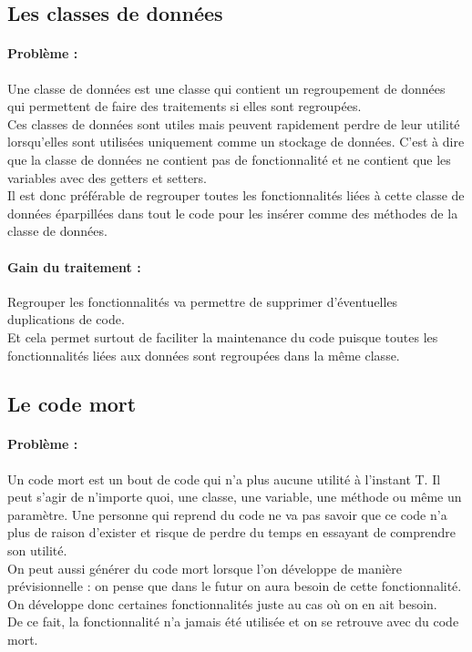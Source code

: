 \documentclass[a4paper,twoside,12pt,openright]{report}
\begin{document}
\subsection{Les classes de données}
\paragraph{Problème :}
Une classe de données est une classe qui contient un regroupement de données qui permettent de faire des traitements si elles sont regroupées.\\
Ces classes de données sont utiles mais peuvent rapidement perdre de leur utilité lorsqu'elles sont utilisées uniquement comme un stockage de données. C'est à dire que la classe de données ne contient pas de fonctionnalité et ne contient que les variables avec des getters et setters.\\
Il est donc préférable de regrouper toutes les fonctionnalités liées à cette classe de données éparpillées dans tout le code pour les insérer comme des méthodes de la classe de données.\\ 

\paragraph{Gain du traitement :}
Regrouper les fonctionnalités va permettre de supprimer d'éventuelles  duplications de code.\\
Et cela permet surtout de faciliter la maintenance du code puisque toutes les fonctionnalités liées aux données sont regroupées dans la même classe.\\

\subsection{Le code mort}
\paragraph{Problème :}
Un code mort est un bout de code qui n'a plus aucune utilité à l'instant T. Il peut s'agir de n'importe quoi, une classe, une variable, une méthode ou même un paramètre.
Une personne qui reprend du code ne va pas savoir que ce code n'a plus de raison d'exister et risque de perdre du temps en essayant de comprendre son utilité.\\

On peut aussi générer du code mort lorsque l'on développe de manière prévisionnelle : on pense que dans le futur on aura besoin de cette fonctionnalité.
On développe donc certaines fonctionnalités juste au cas où on en ait besoin.\\
De ce fait, la fonctionnalité n'a jamais été utilisée et on se retrouve avec du code mort.\\
\end{document}
